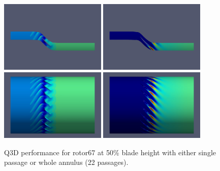 \documentclass[journal,final]{new-aiaa}
\begin{document}
\begin{figure}[htb]
	\centering   
	\includegraphics[width=0.45\textwidth]{pic/pressure-1passage.jpeg}
	\includegraphics[width=0.45\textwidth]{pic/sa-1passage.jpeg}\\    \includegraphics[width=0.45\textwidth]{pic/pressure-22passage.jpeg}
	\includegraphics[width=0.45\textwidth]{pic/sa-22passage.jpeg}
	\caption{Q3D performance for rotor67 at 50\% blade height with either
		single passage or whole annulus (22 passages).}
	\label{fig:r67-flow}
\end{figure}
\end{document}
